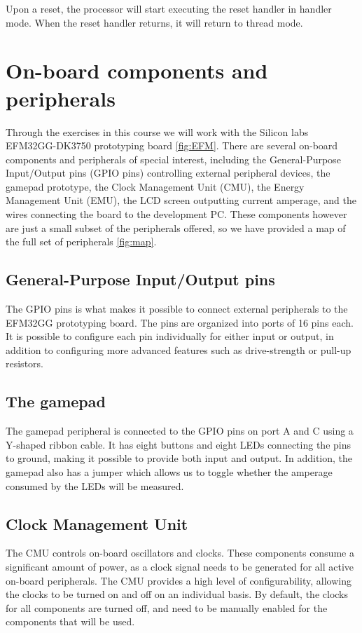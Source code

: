 Upon a reset, the processor will start executing the reset handler in handler mode. When the reset handler returns, it will return to thread mode.

\section{On-board components and peripherals}

Through the exercises in this course we will work with the  Silicon labs EFM32GG-DK3750 prototyping board \ref{fig:EFM}. There are several on-board components and peripherals of special interest, including the General-Purpose Input/Output pins (GPIO pins) controlling external peripheral devices, the gamepad prototype, the Clock Management Unit (CMU), the Energy Management Unit (EMU), the LCD screen outputting current amperage, and the wires connecting the board to the development PC. These components however are just a small subset of the peripherals offered, so we have provided a map of the full set of peripherals \ref{fig:map}.

\subsection{General-Purpose Input/Output pins}
The GPIO pins is what makes it possible to connect external peripherals to the EFM32GG prototyping board. The pins are organized into ports of 16 pins each. It is possible to configure each pin individually for either input or output, in addition to configuring more advanced features such as drive-strength or pull-up resistors.

\subsection{The gamepad}
The gamepad peripheral is connected to the GPIO pins on port A and C using a Y-shaped ribbon cable. It has eight buttons and eight LEDs connecting the pins to ground, making it possible to provide both input and output. In addition, the gamepad also has a jumper which allows us to toggle whether the amperage consumed by the LEDs will be measured.

\subsection{Clock Management Unit}
The CMU controls on-board oscillators and clocks. These components consume a significant amount of power, as a clock signal needs to be generated for all active on-board peripherals. The CMU provides a high level of configurability, allowing the clocks to be turned on and off on an individual basis. By default, the clocks for all components are turned off, and need to be manually enabled for the components that will be used.\cite{EFM32GG-RM}

